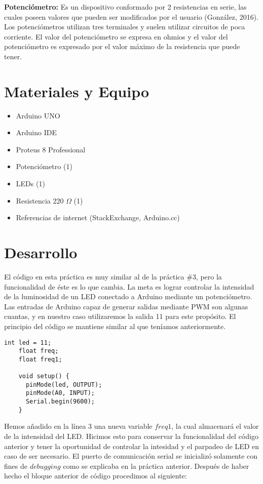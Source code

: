 \documentclass[12pt, letterpaper]{article}
\begin{document}
\textbf{Potenciómetro:} Es un dispositivo conformado por 2 resistencias en serie, las cuales poseen valores que pueden ser modificados por el usuario (González, 2016). Los potenciómetros utilizan tres terminales y suelen utilizar circuitos de poca corriente. El valor del potenciómetro se expresa en ohmios y el valor del potenciómetro es expresado por el valor máximo de la resistencia que puede tener.

\section*{Materiales y Equipo}
\begin{itemize}
	\item Arduino UNO
	\item Arduino IDE
	\item Proteus 8 Professional
	\item Potenciómetro (1)
	\item LEDs (1)
	\item Resistencia 220 $\Omega$ (1)
	\item Referencias de internet (StackExchange, Arduino.cc)
\end{itemize}

\section*{Desarrollo}
El código en esta práctica es muy similar al de la práctica \#3, pero la funcionalidad de éste es lo que cambia. La meta es lograr controlar la intensidad de la luminosidad de un LED conectado a Arduino mediante un potenciómetro. Las entradas de Arduino capaz de generar salidas mediante PWM son algunas cuantas, y en nuestro caso utilizaremos la salida 11 para este propósito. El principio del código se mantiene similar al que teníamos anteriormente.

\begin{lstlisting}[language=Arduino]
	int led = 11;
	float freq;
	float freq1;

	void setup() {
	  pinMode(led, OUTPUT);
	  pinMode(A0, INPUT);
	  Serial.begin(9600);
	}
\end{lstlisting}

Hemos añadido en la línea 3 una nueva variable $freq1$, la cual almacenará el valor de la intensidad del LED. Hicimos esto para conservar la funcionalidad del código anterior y tener la oportunidad de controlar la intesidad y el parpadeo de LED en caso de ser necesario. El puerto de comunicación serial se inicializó solamente con fines de $debugging$ como se explicaba en la práctica anterior. Después de haber hecho el bloque anterior de código procedimos al siguiente:
\end{document}
